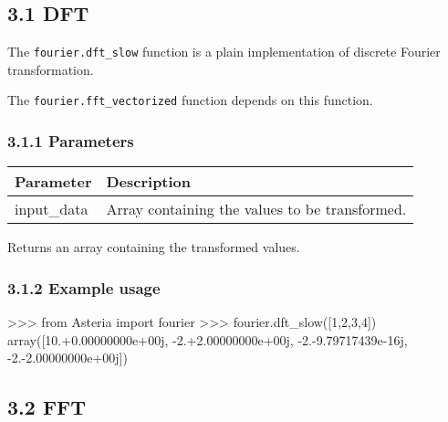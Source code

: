 \documentclass[]{article}
\newenvironment{Shaded}{}{}
\newcommand{\DecValTok}[1]{\textcolor[rgb]{0.25,0.63,0.44}{#1}}
\newcommand{\FloatTok}[1]{\textcolor[rgb]{0.25,0.63,0.44}{#1}}
\newcommand{\ImportTok}[1]{#1}
\newcommand{\OperatorTok}[1]{\textcolor[rgb]{0.40,0.40,0.40}{#1}}
\newcommand{\NormalTok}[1]{#1}
\begin{document}
\subsection{3.1 DFT}\label{dft}

The \texttt{fourier.dft\_slow} function is a plain implementation of
discrete Fourier transformation.

The \texttt{fourier.fft\_vectorized} function depends on this function.

\subsubsection{3.1.1 Parameters}\label{parameters}

\begin{longtable}[]{@{}ll@{}}
\toprule
Parameter & Description\tabularnewline
\midrule
\endhead
input\_data & Array containing the values to be
transformed.\tabularnewline
\bottomrule
\end{longtable}

Returns an array containing the transformed values.

\subsubsection{3.1.2 Example usage}\label{example-usage}

\begin{Shaded}
\begin{Highlighting}[]
\OperatorTok{>>>} \ImportTok{from}\NormalTok{ Asteria }\ImportTok{import}\NormalTok{ fourier}
\OperatorTok{>>>}\NormalTok{ fourier.dft_slow([}\DecValTok{1}\NormalTok{,}\DecValTok{2}\NormalTok{,}\DecValTok{3}\NormalTok{,}\DecValTok{4}\NormalTok{])}
\NormalTok{array([}\DecValTok{10}\NormalTok{.}\OperatorTok{+}\FloatTok{0.}\NormalTok{00000000e}\OperatorTok{+}\NormalTok{00j, }\OperatorTok{-}\DecValTok{2}\NormalTok{.}\OperatorTok{+}\FloatTok{2.}\NormalTok{00000000e}\OperatorTok{+}\NormalTok{00j, }\OperatorTok{-}\DecValTok{2}\NormalTok{.}\OperatorTok{-}\FloatTok{9.}\NormalTok{79717439e}\OperatorTok{-}\NormalTok{16j, }\OperatorTok{-}\DecValTok{2}\NormalTok{.}\OperatorTok{-}\FloatTok{2.}\NormalTok{00000000e}\OperatorTok{+}\NormalTok{00j])}
\end{Highlighting}
\end{Shaded}

\subsection{3.2 FFT}\label{fft}
\end{document}
